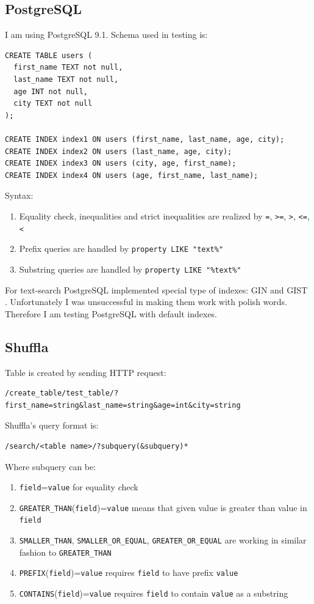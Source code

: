 \documentclass[10pt,a4paper]{article}
\begin{document}
\subsection{PostgreSQL}

I am using PostgreSQL 9.1. Schema used in testing is:

\begin{verbatim}
CREATE TABLE users (
  first_name TEXT not null,
  last_name TEXT not null,
  age INT not null,
  city TEXT not null
);

CREATE INDEX index1 ON users (first_name, last_name, age, city);
CREATE INDEX index2 ON users (last_name, age, city);
CREATE INDEX index3 ON users (city, age, first_name);
CREATE INDEX index4 ON users (age, first_name, last_name);
\end{verbatim}

Syntax:
\begin{enumerate}
\item Equality check, inequalities and strict inequalities are realized by \verb|=|, \verb|>=|, \verb|>|, \verb|<=|, \verb|<|
\item Prefix queries are handled by \verb|property LIKE "text%"|
\item Substring queries are handled by \verb|property LIKE "%text%"|
\end{enumerate}

For text-search PostgreSQL implemented special type of indexes: GIN \cite{PSQLGIN} and GIST \cite{PSQLGIST}. Unfortunately I was unsuccessful in making them work with polish words. Therefore I am testing PostgreSQL with default indexes.

\subsection{Shuffla}

Table is created by sending HTTP request:
\begin{verbatim}
/create_table/test_table/?first_name=string&last_name=string&age=int&city=string
\end{verbatim}
Shuffla's query format is:

\begin{verbatim}
/search/<table name>/?subquery(&subquery)*
\end{verbatim}
Where subquery can be:
\begin{enumerate}
\item \verb|field|=\verb|value| for equality check
\item \verb|GREATER_THAN|(\verb|field|)=\verb|value| means that given value is greater than value in \verb|field| 
\item \verb|SMALLER_THAN|, \verb|SMALLER_OR_EQUAL|, \verb|GREATER_OR_EQUAL| are working in similar fashion to \verb|GREATER_THAN|
\item \verb|PREFIX|(\verb|field|)=\verb|value| requires \verb|field| to have prefix \verb|value|
\item \verb|CONTAINS|(\verb|field|)=\verb|value| requires \verb|field| to contain \verb|value| as a substring
\end{enumerate}
\end{document}

